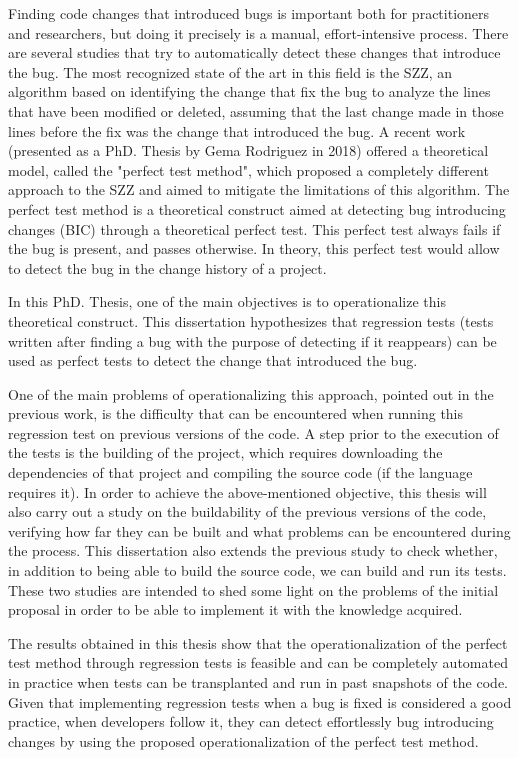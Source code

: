 Finding code changes that introduced bugs is important both for practitioners and researchers, but doing it precisely is a manual, effort-intensive process.
There are several studies that try to automatically detect these changes that introduce the bug. 
The most recognized state of the art in this field is the SZZ, an algorithm based on identifying the change that fix the bug to analyze the lines that have been modified or deleted, assuming that the last change made in those lines before the fix was the change that introduced the bug. 
A recent work (presented as a PhD. Thesis by Gema Rodriguez in 2018) offered a theoretical model, called the "perfect test method", which proposed a completely different approach to the SZZ and aimed to mitigate the limitations of this algorithm. 
The perfect test method is a theoretical construct aimed at detecting bug introducing changes (BIC) through a theoretical perfect test. This perfect test always fails if the bug is present, and passes otherwise.
In theory, this perfect test would allow to detect the bug in the change history of a project.

In this PhD. Thesis, one of the main objectives is to operationalize this theoretical construct. 
This dissertation hypothesizes that regression tests (tests written after finding a bug with the purpose of detecting if it reappears) can be used as perfect tests to detect the change that introduced the bug. 

One of the main problems of operationalizing this approach, pointed out in the previous work, is the difficulty that can be encountered when running this regression test on previous versions of the code. 
A step prior to the execution of the tests is the building of the project, which requires downloading the dependencies of that project and compiling the source code (if the language requires it). 
In order to achieve the above-mentioned objective, this thesis will also carry out a study on the buildability of the previous versions of the code, verifying how far they can be built and what problems can be encountered during the process.
This dissertation also extends the previous study to check whether, in addition to being able to build the source code, we can build and run its tests. 
These two studies are intended to shed some light on the problems of the initial proposal in order to be able to implement it with the knowledge acquired.

The results obtained in this thesis show that the operationalization of the perfect test method through regression tests is feasible and can be completely automated in practice when tests can be transplanted and run in past snapshots of the code. 
Given that implementing regression tests when a bug is fixed is considered a good practice, when developers follow it, they can detect effortlessly bug introducing changes by using the proposed operationalization of the perfect test method.



